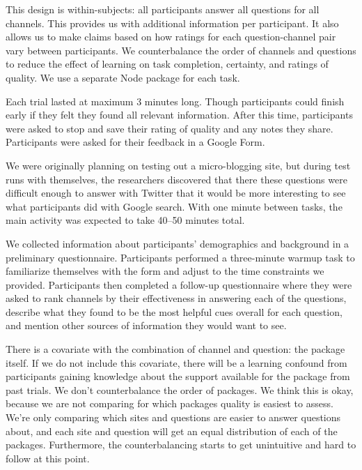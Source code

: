 This design is within-subjects: all participants answer all questions for all channels.
This provides us with additional information per participant.
It also allows us to make claims based on how ratings for each question-channel pair vary between participants.
We counterbalance the order of channels and questions to reduce the effect of learning on task completion, certainty, and ratings of quality.
We use a separate Node package for each task.

Each trial lasted at maximum 3 minutes long.
Though participants could finish early if they felt they found all relevant information.
After this time, participants were asked to stop and save their rating of quality and any notes they share.
Participants were asked for their feedback in a Google Form.

We were originally planning on testing out a micro-blogging site, but during test runs with themselves, the researchers discovered that there these questions were difficult enough to answer with Twitter that it would be more interesting to see what participants did with Google search.
With one minute between tasks, the main activity was expected to take 40--50 minutes total.

We collected information about participants' demographics and background in a preliminary questionnaire.
Participants performed a three-minute warmup task to familiarize themselves with the form and adjust to the time constraints we provided.
Participants then completed a follow-up questionnaire where they were asked to rank channels by their effectiveness in answering each of the questions, describe what they found to be the most helpful cues overall for each question, and mention other sources of information they would want to see.
\fi

There is a covariate with the combination of channel and question: the package itself.
If we do not include this covariate, there will be a learning confound from participants gaining knowledge about the support available for the package from past trials.
We don't counterbalance the order of packages.
We think this is okay, because we are not comparing for which packages quality is easiest to assess.
We're only comparing which sites and questions are easier to answer questions about, and each site and question will get an equal distribution of each of the packages.
Furthermore, the counterbalancing starts to get unintuitive and hard to follow at this point.

